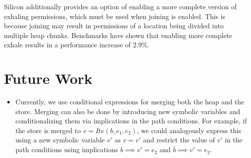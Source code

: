 \documentclass[11pt]{article}
\begin{document}
    Silicon additionally provides an option of enabling a more complete version of exhaling permissions,
    which must be used when joining is enabled. This is because joining may result in permissions of a 
    location being divided into multiple heap chunks. Benchmarks have shown that enabling more complete 
    exhale results in a performance increase of 2.9\%.

    \newpage
    \section{Future Work}

    \begin{itemize}
        \item Currently, we use conditional expressions for merging both
            the heap and the store. Merging can also be done by introducing
            new symbolic variables and conditionalizing them via implications
            in the path conditions. For example, if the store is merged to
            $v = Ite(b, e_1, e_2)$, we could analogously express this using
            a new symbolic variable $v'$ as
            $v = v'$ and restrict the value of $v'$ in the path conditions using implications
            $b \implies v' = e_2$ and $\overline{b} \implies v' = e_2$.
    \end{itemize}

    \newpage
    \printbibliography
    
\end{document}
